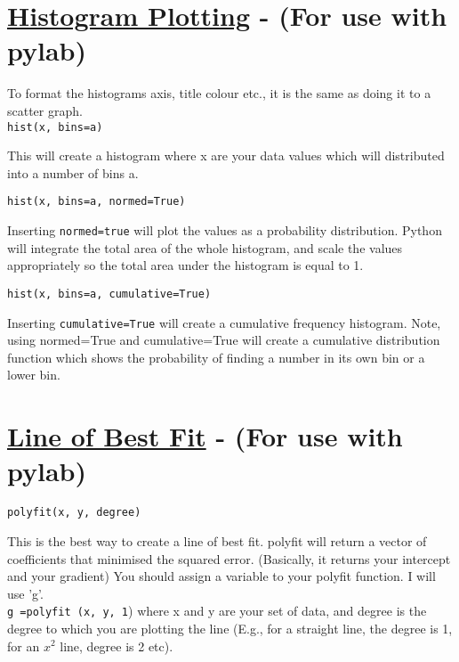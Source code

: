 \section*{\underline{Histogram Plotting}  - ({\color{red}For use with pylab})}
To format the histograms axis, title colour etc., it is the same as doing it to a scatter graph.\\[2ex]
\noindent \texttt{hist(x, bins=a)}
\begin{myindentpar}{1.4cm}
\vspace*{-1ex} 
This will create a histogram where x are your data values which will distributed into a number of bins a. 
\end{myindentpar}

\noindent \texttt{hist(x, bins=a, normed=True)}
\begin{myindentpar}{1.4cm}
\vspace*{-1ex}
Inserting \texttt{normed=true} will plot the values as a probability distribution. Python will integrate the total area of the whole histogram, and scale the values appropriately so the total area under the histogram is equal to 1.
\end{myindentpar}


\noindent \texttt{hist(x, bins=a, cumulative=True)}
\begin{myindentpar}{1.4cm}
\vspace*{-1ex}
Inserting \texttt{cumulative=True} will create a cumulative frequency histogram. Note, using normed=True and cumulative=True will create a cumulative distribution function which shows the probability of finding a number in its own bin or a lower bin.

\end{myindentpar}

\section*{\underline{Line of Best Fit}  - ({\color{red}For use with pylab})}

\noindent \texttt{polyfit(x, y, degree)}
\begin{myindentpar}{1.4cm}
\vspace*{-1ex}
This is the best way to create a line of best fit. polyfit will return a vector of coefficients that minimised the squared error. (Basically, it returns your intercept and your gradient) You should assign a variable to your polyfit function. I will use 'g'.\\
\texttt{g =polyfit (x, y, 1}) where x and y are your set of data, and degree is the degree to which you are plotting the line (E.g., for a straight line, the degree is 1, for an $x^{2}$ line, degree is 2 etc).
\end{myindentpar}

